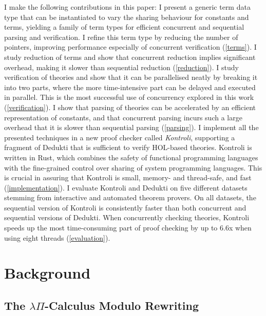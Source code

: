 \documentclass[screen,sigplan,10pt]{acmart}
\begin{document}
I make the following contributions in this paper: I present a generic
term data type that can be instantiated to vary the sharing behaviour
for constants and terms, yielding a family of term types for efficient
concurrent and sequential parsing and verification. I refine this term
type by reducing the number of pointers, improving performance
especially of concurrent verification (\autoref{terms}). I study
reduction of terms and show that concurrent reduction implies
significant overhead, making it slower than sequential reduction
(\autoref{reduction}). I study verification of theories and show that it
can be parallelised neatly by breaking it into two parts, where the more
time-intensive part can be delayed and executed in parallel. This is the
most successful use of concurrency explored in this work
(\autoref{verification}). I show that parsing of theories can be
accelerated by an efficient representation of constants, and that
concurrent parsing incurs such a large overhead that it is slower than
sequential parsing (\autoref{parsing}). I implement all the presented
techniques in a new proof checker called \emph{Kontroli}, supporting a
fragment of Dedukti that is sufficient to verify HOL-based theories.
Kontroli is written in Rust, which combines the safety of functional
programming languages with the fine-grained control over sharing of
system programming languages. This is crucial in assuring that Kontroli
is small, memory- and thread-safe, and fast (\autoref{implementation}).
I evaluate Kontroli and Dedukti on five different datasets stemming from
interactive and automated theorem provers. On all datasets, the
sequential version of Kontroli is consistently faster than both
concurrent and sequential versions of Dedukti. When concurrently
checking theories, Kontroli speeds up the most time-consuming part of
proof checking by up to 6.6x when using eight threads
(\autoref{evaluation}).

\hypertarget{background}{%
\section{Background}\label{background}}

\hypertarget{lpmr}{%
\subsection{\texorpdfstring{The \(\lambda\Pi\)-Calculus Modulo
Rewriting}{The \textbackslash{}lambda\textbackslash{}Pi-Calculus Modulo Rewriting}}\label{lpmr}}
\end{document}
